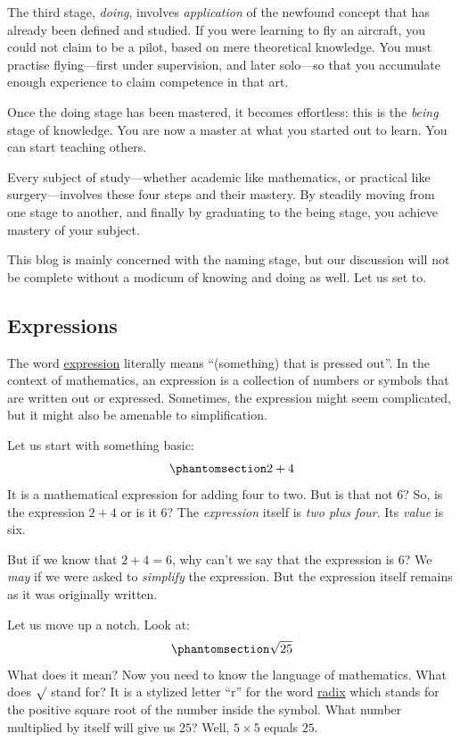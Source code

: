 \documentclass[
  a4paper,
]{article}
\begin{document}
The third stage, \emph{doing}, involves \emph{application} of the
newfound concept that has already been defined and studied. If you were
learning to fly an aircraft, you could not claim to be a pilot, based on
mere theoretical knowledge. You must practise flying---first under
supervision, and later solo---so that you accumulate enough experience
to claim competence in that art.

Once the doing stage has been mastered, it becomes effortless: this is
the \emph{being} stage of knowledge. You are now a master at what you
started out to learn. You can start teaching others.

Every subject of study---whether academic like mathematics, or practical
like surgery---involves these four steps and their mastery. By steadily
moving from one stage to another, and finally by graduating to the being
stage, you achieve mastery of your subject.

This blog is mainly concerned with the naming stage, but our discussion
will not be complete without a modicum of knowing and doing as well. Let
us set to.

\subsection{Expressions}\label{expressions}

The word
\href{https://www.etymonline.com/search?q=expression}{expression}
literally means ``(something) that is pressed out''. In the context of
mathematics, an expression is a collection of numbers or symbols that
are written out or expressed. Sometimes, the expression might seem
complicated, but it might also be amenable to simplification.

Let us start with something basic:
\begin{equation}\phantomsection\label{eq:two-plus-four}{
2 + 4
}\end{equation} It is a mathematical expression for adding four to two.
But is that not \(6\)? So, is the expression \(2 + 4\) or is it \(6\)?
The \emph{expression} itself is \emph{two plus four}. Its \emph{value}
is six.

But if we know that \(2 + 4 = 6\), why can't we say that the expression
is \(6\)? We \emph{may} if we were asked to \emph{simplify} the
expression. But the expression itself remains as it was originally
written.

Let us move up a notch. Look at:
\begin{equation}\phantomsection\label{eq:sqrt5}{
\sqrt{25}
}\end{equation} What does it mean? Now you need to know the language of
mathematics. What does \(\surd\) stand for? It is a stylized letter
``r'' for the word
\href{https://en.wikipedia.org/wiki/Square_root}{radix} which stands for
the positive square root of the number inside the symbol. What number
multiplied by itself will give us \(25\)? Well, \(5 \times 5\) equals
\(25\).
\end{document}
